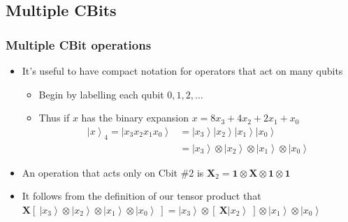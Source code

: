\documentclass{beamer}
\newcommand{\ket}[1]{\left|{#1}\right\rangle}
\newcommand{\iop}{\textbf{1}}
\newcommand{\xop}{\textbf{X}}
\begin{document}
  \subsection{Multiple CBits}
  \begin{frame}
    \frametitle{Multiple CBit operations}
    \begin{itemize}
      \item{It's useful to have compact notation for operators that act on many qubits}
      \begin{itemize}
        \item{Begin by labelling each qubit $0,1,2,\ldots$} \linebreak
        \item{Thus if $x$ has the binary expansion $x=8x_{3}+4x_{2}+2x_{1}+x_{0}$}
        \begin{align*}
        \ket{x}_{4} = \ket{x_{3}x_{2}x_{1}x_{0}} &= \ket{x_{3}} \ket{x_{2}} \ket{x_{1}} \ket{x_{0}} \\
                    &= \ket{x_{3}} \otimes \ket{x_{2}} \otimes \ket{x_{1}} \otimes \ket{x_{0}}
        \end{align*}
      \end{itemize}

      \item{An operation that acts only on Cbit \#2 is} \linebreak
      $\xop_{2}=\iop \otimes \xop \otimes \iop \otimes \iop$
      \item{It follows from the definition of our tensor product that} \linebreak
      $\xop [ \ \ket{x_{3}} \otimes  \ket{x_{2}} \otimes \ket{x_{1}}\otimes  \ket{x_{0}} \ ] = 
       \ket{x_{3}} \otimes [ \ \xop \ket{x_{2}} \ ] \otimes \ket{x_{1}} \otimes \ket{x_{0}} $
    \end{itemize}
  \end{frame}
\end{document}
